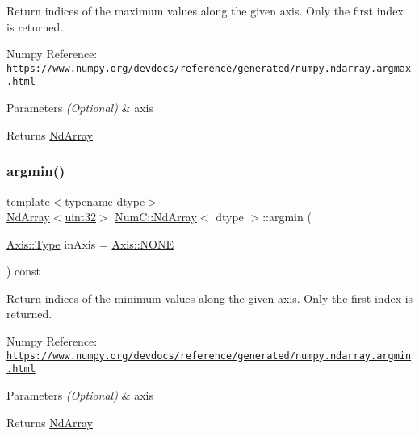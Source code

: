 Return indices of the maximum values along the given axis. Only the first index is returned.

Numpy Reference\+: \href{https://www.numpy.org/devdocs/reference/generated/numpy.ndarray.argmax.html}{\tt https\+://www.\+numpy.\+org/devdocs/reference/generated/numpy.\+ndarray.\+argmax.\+html}


\begin{DoxyParams}{Parameters}
{\em (\+Optional)} & axis \\
\hline
\end{DoxyParams}
\begin{DoxyReturn}{Returns}
\mbox{\hyperlink{class_num_c_1_1_nd_array}{Nd\+Array}} 
\end{DoxyReturn}
\mbox{\label{class_num_c_1_1_nd_array_a2029b396cc040cd9666b31d0ebfce0aa}} 
\subsubsection{\texorpdfstring{argmin()}{argmin()}}
{\footnotesize\ttfamily template$<$typename dtype$>$ \\
\mbox{\hyperlink{class_num_c_1_1_nd_array}{Nd\+Array}}$<$\mbox{\hyperlink{namespace_num_c_ae685802ca6d3035f2b400b081e3953fa}{uint32}}$>$ \mbox{\hyperlink{class_num_c_1_1_nd_array}{Num\+C\+::\+Nd\+Array}}$<$ dtype $>$\+::argmin (\begin{DoxyParamCaption}\item[{\mbox{\hyperlink{struct_num_c_1_1_axis_a8e689044ef1941a03482e730c5e7ebb3}{Axis\+::\+Type}}}]{in\+Axis = {\ttfamily \mbox{\hyperlink{struct_num_c_1_1_axis_a8e689044ef1941a03482e730c5e7ebb3a0ae033c4226f7184bf0050b101e7ed94}{Axis\+::\+N\+O\+NE}}} }\end{DoxyParamCaption}) const\hspace{0.3cm}{\ttfamily [inline]}}

Return indices of the minimum values along the given axis. Only the first index is returned.

Numpy Reference\+: \href{https://www.numpy.org/devdocs/reference/generated/numpy.ndarray.argmin.html}{\tt https\+://www.\+numpy.\+org/devdocs/reference/generated/numpy.\+ndarray.\+argmin.\+html}


\begin{DoxyParams}{Parameters}
{\em (\+Optional)} & axis \\
\hline
\end{DoxyParams}
\begin{DoxyReturn}{Returns}
\mbox{\hyperlink{class_num_c_1_1_nd_array}{Nd\+Array}} 
\end{DoxyReturn}
\mbox{\label{class_num_c_1_1_nd_array_a3ce62796f80e2d3f19969ee3f75a6f18}} 
